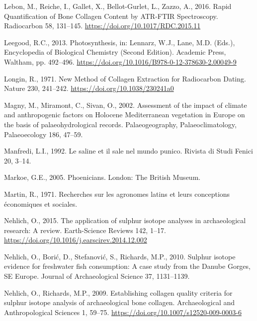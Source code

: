 \documentclass[3p]{elsarticle} %
\newlength{\cslhangindent}
\newlength{\cslentryspacingunit} %
\newenvironment{CSLReferences}[2] %
 {%
  \setlength{\parindent}{0pt}
  \ifodd #1
  \let\oldpar\par
  \def\par{\hangindent=\cslhangindent\oldpar}
  \fi
  \setlength{\parskip}{#2\cslentryspacingunit}
 }%
 {}
\begin{document}
\begin{CSLReferences}{1}{0}
\leavevmode{}%
Lebon, M., Reiche, I., Gallet, X., Bellot-Gurlet, L., Zazzo, A., 2016. Rapid {Quantification} of {Bone Collagen Content} by {ATR}-{FTIR Spectroscopy}. Radiocarbon 58, 131--145. \url{https://doi.org/10.1017/RDC.2015.11}

\leavevmode{}%
Leegood, R.C., 2013. Photosynthesis, in: Lennarz, W.J., Lane, M.D. (Eds.), Encyclopedia of {Biological Chemistry} ({Second Edition}). {Academic Press}, {Waltham}, pp. 492--496. \url{https://doi.org/10.1016/B978-0-12-378630-2.00049-9}

\leavevmode{}%
Longin, R., 1971. New {Method} of {Collagen Extraction} for {Radiocarbon Dating}. Nature 230, 241--242. \url{https://doi.org/10.1038/230241a0}

\leavevmode{}%
Magny, M., Miramont, C., Sivan, O., 2002. Assessment of the impact of climate and anthropogenic factors on {Holocene Mediterranean} vegetation in {Europe} on the basis of palaeohydrological records. Palaeogeography, Palaeoclimatology, Palaeoecology 186, 47--59.

\leavevmode{}%
Manfredi, L.I., 1992. Le saline et il sale nel mundo punico. Rivista di Studi Fenici 20, 3--14.

\leavevmode{}%
Markoe, G.E., 2005. Phoenicians. {London}: {The British Museum}.

\leavevmode{}%
Martin, R., 1971. Recherches sur les agronomes latins et leurs conceptions économiques et sociales.

\leavevmode{}%
Nehlich, O., 2015. The application of sulphur isotope analyses in archaeological research: {A} review. Earth-Science Reviews 142, 1--17. \url{https://doi.org/10.1016/j.earscirev.2014.12.002}

\leavevmode{}%
Nehlich, O., Borić, D., Stefanović, S., Richards, M.P., 2010. Sulphur isotope evidence for freshwater fish consumption: A case study from the {Danube Gorges}, {SE Europe}. Journal of Archaeological Science 37, 1131--1139.

\leavevmode{}%
Nehlich, O., Richards, M.P., 2009. Establishing collagen quality criteria for sulphur isotope analysis of archaeological bone collagen. Archaeological and Anthropological Sciences 1, 59--75. \url{https://doi.org/10.1007/s12520-009-0003-6}


\end{CSLReferences}
\end{document}
